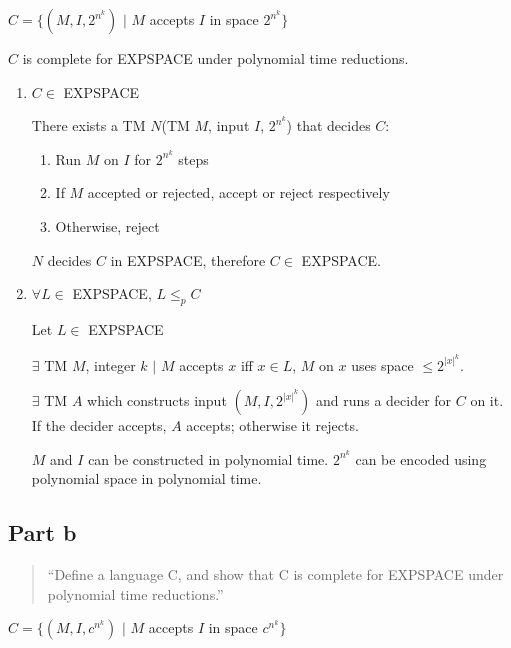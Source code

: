 \documentclass{article}
\begin{document}
$C = \{(M,I,2^{n^{k}})$ $|$ $M$ accepts $I$ in space $2^{n^{k}}\}$

\medskip
$C$ is complete for EXPSPACE under polynomial time reductions.
\begin{enumerate}[label=\arabic*)]
    \item $C \in$ EXPSPACE
    
    There exists a TM $N$(TM $M$, input $I$, $2^{n^{k}}$) that decides $C$:
    \begin{enumerate}[label=]
        \item Run $M$ on $I$ for $2^{n^{k}}$ steps
        \item If $M$ accepted or rejected, accept or reject respectively
        \item Otherwise, reject
    \end{enumerate}

    $N$ decides $C$ in EXPSPACE, therefore $C\in$ EXPSPACE.
    
    
    \item $\forall L \in$ EXPSPACE, $L \leq_{p} C$
    
    Let $L \in$ EXPSPACE
    
    $\exists$ TM $M$, integer $k$ $|$ $M$ accepts $x$ iff $x \in L$, $M$ on $x$ uses space $\leq 2^{|x|^{k}}$.
    
    $\exists$ TM $A$ which constructs input $(M,I,2^{|x|^{k}})$ and runs a decider for $C$ on it.  If the decider accepts, $A$ accepts; otherwise it rejects.
    
    $M$ and $I$ can be constructed in polynomial time. $2^{n^{k}}$ can be encoded using polynomial space in polynomial time.  
\end{enumerate}

\subsection{Part b}
\begin{quote}
``Define a language C, and show that C is complete for EXPSPACE under polynomial time reductions.''
\end{quote}

$C = \{(M,I,c^{n^{k}})$ $|$ $M$ accepts $I$ in space $c^{n^{k}}\}$
\end{document}
